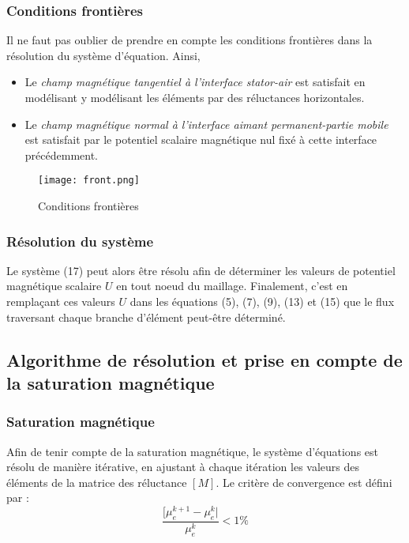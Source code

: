 \subsubsection{Conditions frontières}
Il ne faut pas oublier de prendre en compte les conditions frontières dans la résolution du système d'équation. Ainsi,

\begin{itemize}
    \item Le \textit{champ magnétique tangentiel à l'interface stator-air} est satisfait en modélisant y modélisant les éléments par des réluctances horizontales.
    \item Le \textit{champ magnétique normal à l'interface aimant permanent-partie mobile} est satisfait par le potentiel scalaire magnétique nul fixé à cette interface précédemment.
\end{itemize}

\begin{figure}[H]
    \centering
    \texttt{[image: front.png]}
    \caption{Conditions frontières}
\end{figure}

\subsubsection{Résolution du système}
Le système (17) peut alors être résolu afin de déterminer les valeurs de potentiel magnétique scalaire $U$ en tout noeud du maillage. Finalement, c'est en remplaçant ces valeurs $U$ dans les équations (5), (7), (9), (13) et (15) que le flux traversant chaque branche d'élément peut-être déterminé.

\newpage
\subsection{Algorithme de résolution et prise en compte de la saturation magnétique}
\subsubsection{Saturation magnétique}
Afin de tenir compte de la saturation magnétique, le système d’équations est résolu de
manière itérative, en ajustant à chaque itération les valeurs des éléments de la matrice des
réluctance $[M]$. Le critère de convergence est défini par :
\begin{equation}
    \frac{[\mu_e^{k+1}-\mu_e^k|}{\mu_e^k}<1\%
\end{equation}

